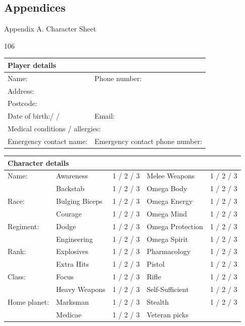\subsection{Appendices}

Appendix A. Character Sheet

106

\begin{table}
\begin{tabular}{|l|l|} \hline 
\multicolumn{2}{|l|}{\textbf{Player details}} \\
 \hline Name: & Phone number: \\
 \hline \multicolumn{2}{|l|}{Address:} \\
 \hline \multicolumn{2}{|l|}{Postcode:} \\
 \hline  Date of birth:/	/ & Email: \\
 \hline \multicolumn{2}{|l|}{Medical conditions / allergies:} \\
 \hline Emergency contact name: & Emergency contact phone number: \\
 \hline \end{tabular}

\end{table}

\begin{table}
\begin{tabular}{|l|l|l|l|l|} \hline 
\multicolumn{5}{|l|}{\textbf{Character details}} \\
 \hline \multirow{1}{*}{Name:}& Awareness & 1 / 2 / 3 & Melee Weapons & 1 / 2 / 3 \\
\cline{2-2}\cline{3-3}\cline{4-4}\cline{5-5} & Backstab & 1 / 2 / 3 & Omega Body & 1 / 2 / 3 \\
 \hline \multirow{1}{*}{Race:}& Bulging Biceps & 1 / 2 / 3 & Omega Energy & 1 / 2 / 3 \\
\cline{2-2}\cline{3-3}\cline{4-4}\cline{5-5} & Courage & 1 / 2 / 3 & Omega Mind & 1 / 2 / 3 \\
 \hline \multirow{1}{*}{Regiment:}& Dodge & 1 / 2 / 3 & Omega Protection & 1 / 2 / 3 \\
\cline{2-2}\cline{3-3}\cline{4-4}\cline{5-5} & Engineering & 1 / 2 / 3 & Omega Spirit & 1 / 2 / 3 \\
 \hline \multirow{1}{*}{Rank:}& Explosives & 1 / 2 / 3 & Pharmacology & 1 / 2 / 3 \\
\cline{2-2}\cline{3-3}\cline{4-4}\cline{5-5} & Extra Hits & 1 / 2 / 3 & Pistol & 1 / 2 / 3 \\
 \hline \multirow{1}{*}{Class:}& Focus & 1 / 2 / 3 & Rifle & 1 / 2 / 3 \\
\cline{2-2}\cline{3-3}\cline{4-4}\cline{5-5} & Heavy Weapons & 1 / 2 / 3 & Self-Sufficient & 1 / 2 / 3 \\
 \hline \multirow{1}{*}{Home planet:}& Marksman & 1 / 2 / 3 & Stealth & 1 / 2 / 3 \\
\cline{2-2}\cline{3-3}\cline{4-4}\cline{5-5} & Medicae & 1 / 2 / 3 & Veteran picks &  \\
 \hline \end{tabular}

\end{table}

